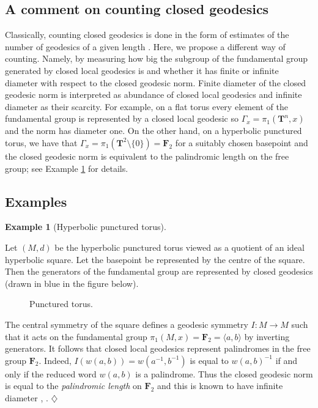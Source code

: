 \documentclass[12pt]{amsart}
\newcommand{\B}[1]{{\mathbf #1}}
\theoremstyle{definition}
\newtheorem{example}[subsection]{Example}
\theoremstyle{remark}
\numberwithin{figure}{section}
\numberwithin{table}{section}
\numberwithin{equation}{section}
\begin{document}
\subsection{A comment on counting closed geodesics} 

Classically, counting closed geodesics is done in the form of estimates of the
number of geodesics of a given length \cite{MR630586}.  Here, we propose a
different way of counting. Namely, by measuring how big the subgroup of the
fundamental group generated by closed local geodesics is and whether it has
finite or infinite diameter with respect to the closed geodesic norm.
Finite diameter of the closed geodesic norm is interpreted as
abundance of closed local geodesics and infinite diameter as their scarcity.
For example, on a flat torus every element of the fundamental group is
represented by a closed local geodesic so $\Gamma_x=\pi_1(\B T^n,x)$ and the
norm has diameter one. On the other hand, on a hyperbolic punctured torus, we
have that $\Gamma_x=\pi_1(\B T^2\setminus\{0\})=\B F_2$ for a suitably chosen
basepoint and the closed geodesic norm is equivalent to the palindromic length
on the free group; see Example \ref{E:torus} for details.

\subsection{Examples}
\begin{example}[Hyperbolic punctured torus]\label{E:torus}

Let $(M,d)$ be the hyperbolic punctured torus viewed as a quotient of an ideal
hyperbolic square. Let the basepoint be represented by the centre of the square.
Then the generators of the fundamental group are represented by closed geodesics
(drawn in blue in the figure below).
\begin{figure}[h]\label{F:}
\caption{Punctured torus. }
\end{figure}
The central symmetry of the square defines a geodesic symmetry $I\colon M\to M$
such that it acts on the fundamental group $\pi_1(M,x) = \B F_2 = \langle a,b \rangle$
by inverting generators. It follows that closed local geodesics represent palindromes
in the free group $\B F_2$. Indeed, $I(w(a,b)) = w(a^{-1},b^{-1})$ is equal to
$w(a,b)^{-1}$ if and only if the reduced word $w(a,b)$ is a palindrome.
Thus the closed geodesic norm is equal to the {\em palindromic length} on
$\B F_2$ and this is known to have infinite diameter \cite{MR2125453},
\cite[Example 6.7]{MR3730755}.
\hfill $\diamondsuit$
\end{example}
\end{document}
